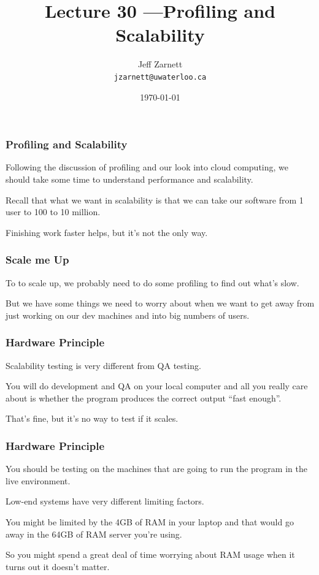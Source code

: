 

\title{Lecture 30 ---Profiling and Scalability}

\author{Jeff Zarnett\\ \small \texttt{jzarnett@uwaterloo.ca}}
\date{\today}




\begin{frame}
  \titlepage

 \end{frame}



\begin{frame}
\frametitle{Profiling and Scalability}

Following the discussion of profiling and our look into cloud computing, we should take some time to understand performance and scalability. 

Recall that what we want in scalability is that we can take our software from 1 user to 100 to 10 million. 

Finishing work faster helps, but it's not the only way.

\end{frame}


\begin{frame}
\frametitle{Scale me Up}

To to scale up, we probably need to do some profiling to find out what's slow.

But we have some things we need to worry about when we want to get away from just working on our dev machines and into big numbers of users.

\end{frame}



\begin{frame}
\frametitle{Hardware Principle}

Scalability testing is very different from  QA testing.

You will do development and QA on your local computer and all you really care about is whether the program produces the correct output ``fast enough''. 

That's fine, but it's no way to test if it scales. 


\end{frame}



\begin{frame}
\frametitle{Hardware Principle}

You should be testing on the machines that are going to run the program in the live environment. 

Low-end systems have very different limiting factors. 

You might be limited by the 4GB of RAM in your laptop and that would go away in the 64GB of RAM server you're using. 

So you might spend a great deal of time worrying about RAM usage when it turns out it doesn't matter.

\end{frame}



